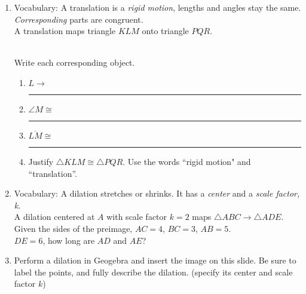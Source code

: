 \documentclass[12pt, twoside]{article}
\begin{document}
\begin{enumerate}
\newpage
\item Vocabulary: A translation is a \emph{rigid motion}, lengths and angles stay the same. \emph{Corresponding} parts are congruent. \\[0.5cm]
A translation maps triangle $KLM$ onto triangle $PQR$. \vspace{0.5cm}
    \begin{multicols}{2}
      \\
      Write each corresponding object.
      \begin{enumerate}
        \item $L \rightarrow$ \rule{2cm}{0.15mm}
        \item $\angle M \cong$ \rule{2cm}{0.15mm}
        \item $\overline {LM} \cong$ \rule{2cm}{0.15mm}
        \item Justify $\triangle KLM \cong \triangle PQR$. Use the words ``rigid motion" and ``translation''.
      \end{enumerate}
    \end{multicols}

\newpage
\item Vocabulary: A dilation stretches or shrinks. It has a \emph{center} and a \emph{scale factor, k}. \\[0.5cm]
A dilation centered at $A$ with scale factor $k=2$ maps $\triangle ABC \rightarrow \triangle ADE$. Given the sides of the preimage, $AC = 4$, $BC = 3$, $AB = 5$. \\[0.5cm]
$DE = 6$, how long are $AD$ and $AE$?
    \begin{flushright}
    \end{flushright}

\newpage
\item Perform a dilation in Geogebra and insert the image on this slide. Be sure to label the points, and fully describe the dilation. (specify its center and scale factor $k$)


\end{enumerate}
\end{document}
